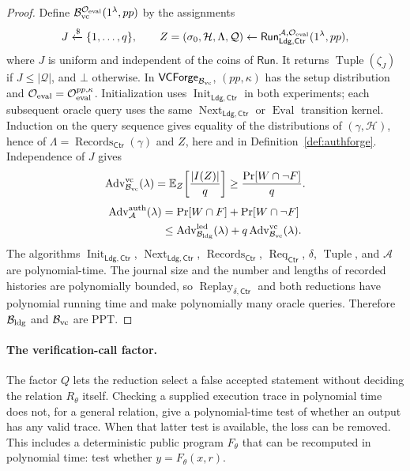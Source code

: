 \documentclass[10pt,letterpaper]{article}
\newcommand{\Ldg}{\mathsf{Ldg}}
\newcommand{\Ctr}{\mathsf{Ctr}}
\newcommand{\EvalO}{\mathcal O_{\rm eval}}
\begin{document}
\begin{proof}
Define $\mathcal B_{\rm vc}^{\EvalO}(1^\lambda,pp)$ by the assignments
\[
 J\xleftarrow{\$}\{1,\ldots,q\},\qquad
 Z=(\sigma_0,\mathcal H,\Lambda,\mathcal Q)
    \leftarrow\mathsf{Run}_{\Ldg,\Ctr}^{\mathcal A,\EvalO}(1^\lambda,pp),
\]
where $J$ is uniform and independent of the coins of $\mathsf{Run}$. It returns $\operatorname{Tuple}(\zeta_J)$ if $J\leq|\mathcal Q|$, and $\bot$ otherwise. In $\mathsf{VCForge}_{\mathcal B_{\rm vc}}$, $(pp,\kappa)$ has the setup distribution and $\EvalO=\EvalO^{pp,\kappa}$. Initialization uses $\operatorname{Init}_{\Ldg,\Ctr}$ in both experiments; each subsequent oracle query uses the same $\operatorname{Next}_{\Ldg,\Ctr}$ or $\operatorname{Eval}$ transition kernel. Induction on the query sequence gives equality of the distributions of $(\gamma,\mathcal H)$, hence of $\Lambda=\operatorname{Records}_{\Ctr}(\gamma)$ and $Z$, here and in Definition~\ref{def:authforge}. Independence of $J$ gives
\[
 \operatorname{Adv}^{\rm vc}_{\mathcal B_{\rm vc}}(\lambda)
 =\mathbb E_Z\!\left[\frac{|I(Z)|}{q}\right]
 \geq\frac{\Pr[W\cap\neg F]}{q}.
\]
\begin{align*}
 \operatorname{Adv}^{\rm auth}_{\mathcal A}(\lambda)
 &=\Pr[W\cap F]+\Pr[W\cap\neg F]\\
 &\leq\operatorname{Adv}^{\rm led}_{\mathcal B_{\rm ldg}}(\lambda)
       +q\operatorname{Adv}^{\rm vc}_{\mathcal B_{\rm vc}}(\lambda).
\end{align*}
The algorithms $\operatorname{Init}_{\Ldg,\Ctr}$, $\operatorname{Next}_{\Ldg,\Ctr}$, $\operatorname{Records}_{\Ctr}$, $\operatorname{Req}_{\Ctr}$, $\delta$, $\operatorname{Tuple}$, and $\mathcal A$ are polynomial-time. The journal size and the number and lengths of recorded histories are polynomially bounded, so $\operatorname{Replay}_{\delta,\Ctr}$ and both reductions have polynomial running time and make polynomially many oracle queries. Therefore $\mathcal B_{\rm ldg}$ and $\mathcal B_{\rm vc}$ are PPT.
\end{proof}

\paragraph{The verification-call factor.}
The factor $Q$ lets the reduction select a false accepted statement without deciding the relation $R_\theta$ itself. Checking a supplied execution trace in polynomial time does not, for a general relation, give a polynomial-time test of whether an output has any valid trace. When that latter test is available, the loss can be removed. This includes a deterministic public program $F_\theta$ that can be recomputed in polynomial time: test whether $y=F_\theta(x,r)$.
\end{document}
